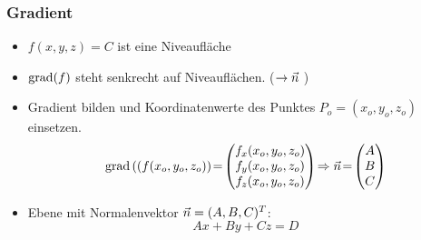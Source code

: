     \subsubsection{Gradient} \label{sec:Gradient}
        \begin{itemize}
            \item $f(x,y,z) = C$ ist eine Niveaufläche
            \item $\mathrm{grad}(f)$ steht senkrecht auf Niveauflächen. ($\to \vec{n}$ )
            \item Gradient bilden und Koordinatenwerte des Punktes $P_o = (x_o,y_o,z_o)$ einsetzen.
            $$ \mathrm{grad}\left((f(x_o, y_o, z_o) \right) \!=\! \begin{pmatrix} f_x(x_o, y_o, z_o) \\ f_y(x_o, y_o, z_o) \\ f_z(x_o, y_o, z_o) \end{pmatrix} \! \Rightarrow \vec{n} \!= \!\begin{pmatrix} A \\ B \\ C \end{pmatrix}$$
            \item Ebene mit Normalenvektor $\vec{n} = (A,B,C)^T$:
            $$
                Ax + By + Cz = D
            $$
        \end{itemize}
        
        
    